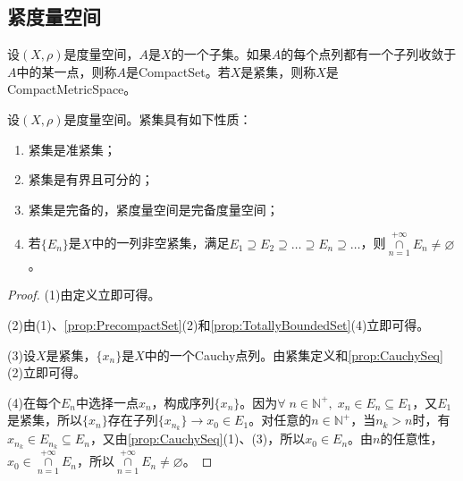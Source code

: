 \subsection{紧度量空间}
\begin{definition}
	设$(X,\rho)$是度量空间，$A$是$X$的一个子集。如果$A$的每个点列都有一个子列收敛于$A$中的某一点，则称$A$是\gls{CompactSet}。若$X$是紧集，则称$X$是\gls{CompactMetricSpace}。
\end{definition}
\begin{property}\label{prop:CompactSet}
	设$(X,\rho)$是度量空间。紧集具有如下性质：
	\begin{enumerate}
		\item 紧集是准紧集；
		\item 紧集是有界且可分的；
		\item 紧集是完备的，紧度量空间是完备度量空间；
		\item 若$\{E_n\}$是$X$中的一列非空紧集，满足$E_1\supseteq E_2\supseteq\dots\supseteq E_n\supseteq\dots$，则$\underset{n=1}{\overset{+\infty}{\cap}}E_n\ne\varnothing$。
	\end{enumerate}
\end{property}
\begin{proof}
	(1)由定义立即可得。\par
	(2)由(1)、\cref{prop:PrecompactSet}(2)和\cref{prop:TotallyBoundedSet}(4)立即可得。\par
	(3)设$X$是紧集，$\{x_n\}$是$X$中的一个Cauchy点列。由紧集定义和\cref{prop:CauchySeq}(2)立即可得。\par
	(4)在每个$E_n$中选择一点$x_n$，构成序列$\{x_n\}$。因为$\forall\;n\in\mathbb{N}^+,\;x_n\in E_n\subseteq E_1$，又$E_1$是紧集，所以$\{x_n\}$存在子列$\{x_{n_k}\}\rightarrow x_0\in E_1$。对任意的$n\in\mathbb{N}^+$，当$n_k>n$时，有$x_{n_k}\in E_{n_k}\subseteq E_n$，又由\cref{prop:CauchySeq}(1)、(3)，所以$x_0\in E_n$。由$n$的任意性，$x_0\in\underset{n=1}{\overset{+\infty}{\cap}}E_n$，所以$\underset{n=1}{\overset{+\infty}{\cap}}E_n\ne\varnothing$。
\end{proof}
